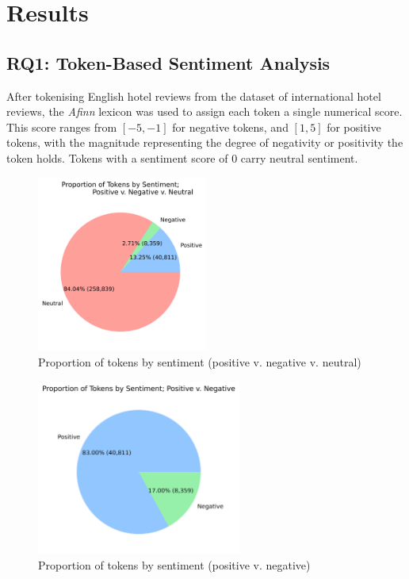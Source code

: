 \documentclass[12pt, bibliography=totocnumbered, paper=a4]{scrartcl}
\def\it#1{\textit{#1}}
\begin{document}
\section{Results}
\subsection{RQ1: Token-Based Sentiment Analysis}
After tokenising English hotel reviews from the dataset of international hotel reviews,
the \it{Afinn} lexicon was used to assign each token a single numerical score. This
score ranges from $[-5, -1]$ for negative tokens, and $[1, 5]$ for positive tokens,
with the magnitude representing the degree of negativity or positivity the token holds.
Tokens with a sentiment score of $0$ carry neutral sentiment.

\begin{figure}[htpb]
	\begin{center}
		\includegraphics[width=0.5\textwidth]{rq1/pie_tripartite.png}
	\end{center}
	\caption{Proportion of tokens by sentiment (positive v. negative v. neutral)}
	\label{fig:reviews-pie1}
\end{figure}

\begin{figure}[htpb]
	\begin{center}
		\includegraphics[width=0.6\textwidth]{rq1/pie_bipartite.png}
	\end{center}
	\caption{Proportion of tokens by sentiment (positive v. negative)}
	\label{fig:reviews-pie2}
\end{figure}
\end{document}
